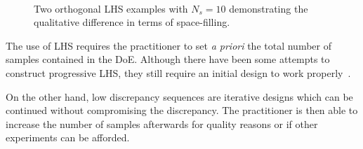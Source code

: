 \begin{figure}[!ht]               
\centering
{}
 ~       
\caption{Two orthogonal LHS examples with $N_s =10$ demonstrating the qualitative difference in terms of space-filling.}
\label{fig:lhs}
\end{figure}

\noindent The use of LHS requires the practitioner to set \emph{a priori} the total number of samples contained in the DoE. Although there have been some attempts to construct progressive LHS, they still require an initial design to work properly~\citep{Sheikholeslami2017}.

On the other hand, low discrepancy sequences are iterative designs which can be continued without compromising the discrepancy. The practitioner is then able to increase the number of samples afterwards for quality reasons or if other experiments can be afforded. 

